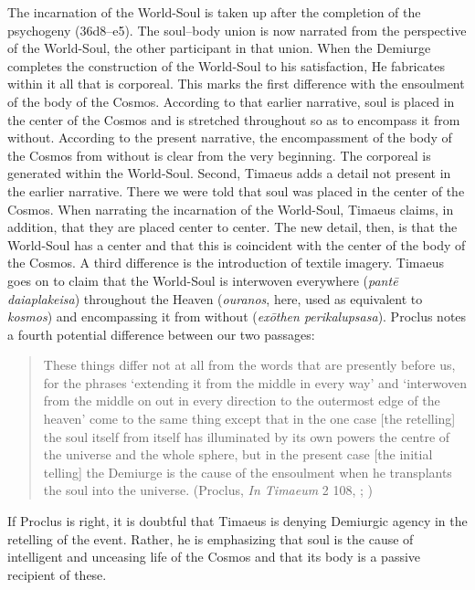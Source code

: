 The incarnation of the World-Soul is taken up after the completion of the psychogeny (36d8–e5). The soul--body union is now narrated from the perspective of the World-Soul, the other participant in that union. When the Demiurge completes the construction of the World-Soul to his satisfaction, He fabricates within it all that is corporeal. This marks the first difference with the ensoulment of the body of the Cosmos. According to that earlier narrative, soul is placed in the center of the Cosmos and is stretched throughout so as to encompass it from without. According to the present narrative, the encompassment of the body of the Cosmos from without is clear from the very beginning. The corporeal is generated within the World-Soul. Second, Timaeus adds a detail not present in the earlier narrative. There we were told that soul was placed in the center of the Cosmos. When narrating the incarnation of the World-Soul, Timaeus claims, in addition, that they are placed center to center. The new detail, then, is that the World-Soul has a center and that this is coincident with the center of the body of the Cosmos. A third difference is the introduction of textile imagery. Timaeus goes on to claim that the World-Soul is interwoven everywhere (\emph{pantē daiaplakeisa}) throughout the Heaven (\emph{ouranos}, here, used as equivalent to \emph{kosmos}) and encompassing it from without (\emph{exōthen perikalupsasa}). Proclus notes a fourth potential difference between our two passages:
\begin{quote}
	These things differ not at all from the words that are presently before us, for the phrases `extending it from the middle in every way' and `interwoven from the middle on out in every direction to the outermost edge of the heaven' come to the same thing except that in the one case [the retelling] the soul itself from itself has illuminated by its own powers the centre of the universe and the whole sphere, but in the present case [the initial telling] the Demiurge is the cause of the ensoulment when he transplants the soul into the universe. (Proclus, \emph{In Timaeum} 2 108, \citealt{Diehl:1903re}; \citealt[64]{Baltzly:2009bc})
\end{quote}
If Proclus is right, it is doubtful that Timaeus is denying Demiurgic agency in the retelling of the event. Rather, he is emphasizing that soul is the cause of intelligent and unceasing life of the Cosmos and that its body is a passive recipient of these.

